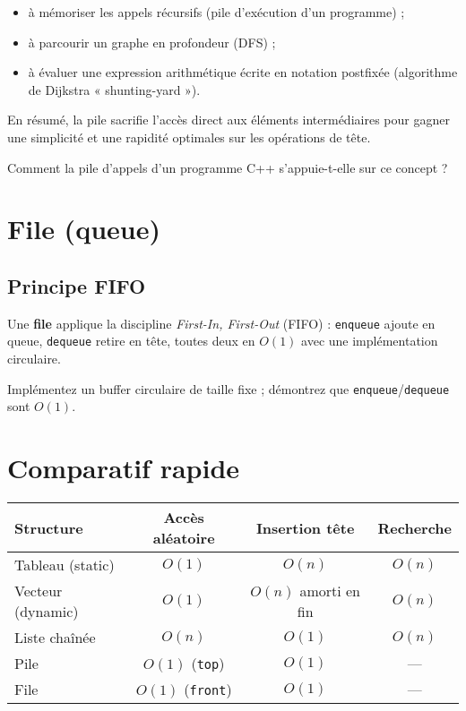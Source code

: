 \begin{itemize}
  \item à mémoriser les appels récursifs (pile d’exécution d’un programme) ;
  \item à parcourir un graphe en profondeur (DFS) ;
  \item à évaluer une expression arithmétique écrite en notation postfixée
        (algorithme de Dijkstra « shunting-yard »).
\end{itemize}

En résumé, la pile sacrifie l’accès direct aux éléments intermédiaires pour
gagner une simplicité et une rapidité optimales sur les opérations de tête.

\begin{reflexion}
Comment la pile d’appels d’un programme C++ s’appuie-t-elle sur ce concept ?
\end{reflexion}

\section{File (queue)}

\subsection{Principe FIFO}
Une \textbf{file} applique la discipline \emph{First-In, First-Out}
(FIFO) :
\lstinline|enqueue| ajoute en queue, \lstinline|dequeue| retire en tête,
toutes deux en $O(1)$ avec une implémentation circulaire.

\begin{exercice}
Implémentez un buffer circulaire de taille fixe ; démontrez que
\lstinline|enqueue|/\lstinline|dequeue| sont $O(1)$.
\end{exercice}

\section{Comparatif rapide}

\begin{center}\small
\begin{tabular}{lccc}
\hline
\textbf{Structure} & \textbf{Accès aléatoire} & \textbf{Insertion tête} & \textbf{Recherche}\\
\hline
Tableau (static) & $O(1)$ & $O(n)$ & $O(n)$ \\
Vecteur (dynamic) & $O(1)$ & $O(n)$ amorti en fin & $O(n)$ \\
Liste chaînée & $O(n)$ & $O(1)$ & $O(n)$ \\
Pile & $O(1)$ (\lstinline|top|) & $O(1)$ & — \\
File & $O(1)$ (\lstinline|front|) & $O(1)$ & — \\
\hline
\end{tabular}
\end{center}

